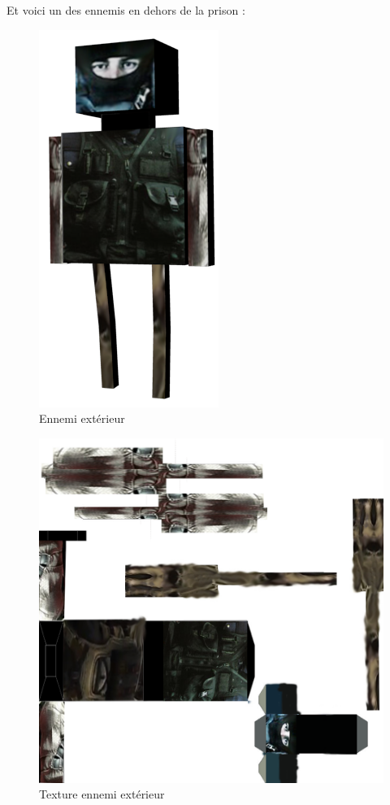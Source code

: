 \documentclass{article}
\begin{document}
Et voici un des ennemis en dehors de la prison : 
\begin{figure}[h]
\begin{center}
\includegraphics[scale=0.4]{ennemidehorsblend.png}
\caption{Ennemi extérieur}
\end{center}
\end{figure}

\begin{figure}[h]
\begin{center}
\includegraphics[scale=0.3]{ennemidehors.png}
\caption{Texture ennemi extérieur}
\end{center}
\end{figure}
\end{document}
